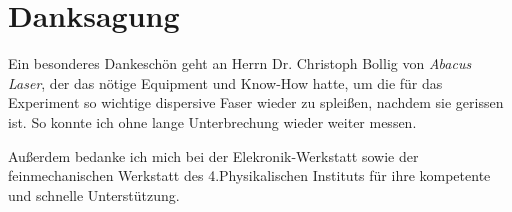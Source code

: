 \documentclass[bachelor,       %
               twoside,        %
               BCOR10mm,       %
               english,ngerman, %
               ]{GAUBM}
\begin{document}
\cleardoublepage
 

\chapter*{Danksagung}
Ein besonderes Dankeschön geht an Herrn Dr. Christoph Bollig von \textit{Abacus Laser}, der das nötige Equipment und Know-How hatte, um die für das Experiment so wichtige dispersive Faser wieder zu spleißen, nachdem sie gerissen ist.
So konnte ich ohne lange Unterbrechung wieder weiter messen.

Außerdem bedanke ich mich bei der Elekronik-Werkstatt sowie der feinmechanischen Werkstatt des 4.Physikalischen Instituts für ihre kompetente und schnelle Unterstützung.

\Declaration
\end{document}
